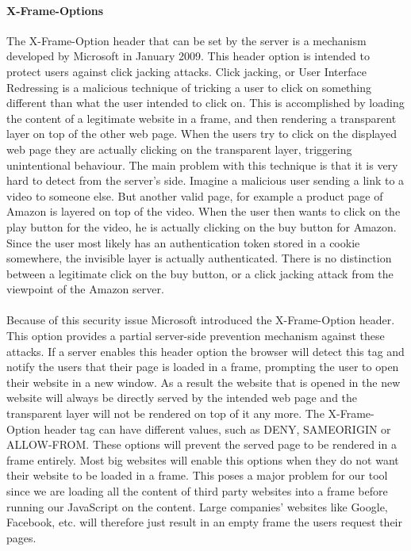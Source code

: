 		\paragraph{X-Frame-Options}
		The X-Frame-Option header that can be set by the server is a mechanism developed by Microsoft in January 2009. This header option is intended to protect users against click jacking attacks. Click jacking, or User Interface Redressing is a malicious technique of tricking a user to click on something different than what the user intended to click on. This is accomplished by loading the content of a legitimate website in a frame, and then rendering a transparent layer on top of the other web page. When the users try to click on the displayed web page they are actually clicking on the transparent layer, triggering unintentional behaviour. The main problem with this technique is that it is very hard to detect from the server's side. Imagine a malicious user sending a link to a video to someone else. But another valid page, for example a product page of Amazon is layered on top of the video. When the user then wants to click on the play button for the video, he is actually clicking on the buy button for Amazon. Since the user most likely has an authentication token stored in a cookie somewhere, the invisible layer is actually authenticated. There is no distinction between a legitimate click on the buy button, or a click jacking attack from the viewpoint of the Amazon server.
	\paragraph{}
	Because of this security issue Microsoft introduced the X-Frame-Option header. This option provides a partial server-side prevention mechanism against these attacks. If a server enables this header option the browser will detect this tag and notify the users that their page is loaded in a frame, prompting the user to open their website in a new window. As a result the website that is opened in the new website will always be directly served by the intended web page and the transparent layer will not be rendered on top of it any more. The X-Frame-Option header tag can have different values, such as DENY, SAMEORIGIN or ALLOW-FROM. These options will prevent the served page to be rendered in a frame entirely. Most big websites will enable this options when they do not want their website to be loaded in a frame. This poses a major problem for our tool since we are loading all the content of third party websites into a frame before running our JavaScript on the content. Large companies' websites like Google, Facebook, etc. will therefore just result in an empty frame the users request their pages.
